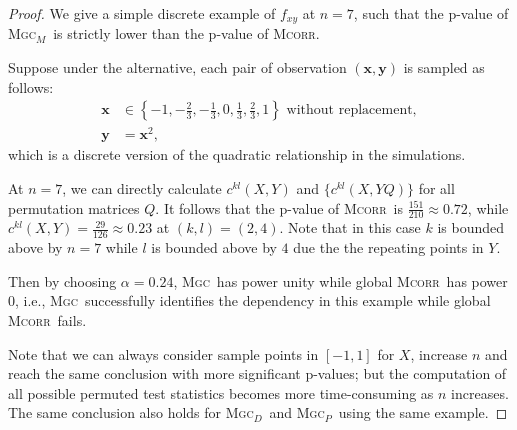 \documentclass[11pt]{article}
\providecommand{\sct}[1]{{\normalfont\textsc{#1}}}
\providecommand{\mb}[1]{\boldsymbol{#1}}
\newcommand{\G}{c}
\newcommand{\Mgc}{\sct{Mgc}}
\newcommand{\Mgcp}{\sct{Mgc$_P$}}
\newcommand{\Mgcd}{\sct{Mgc$_D$}}
\newcommand{\Mgcm}{\sct{Mgc$_M$}}
\newcommand{\Mcorr}{\sct{Mcorr}}
\begin{document}
\begin{proof}
We give a simple discrete example of $f_{xy}$ at $n=7$, such that the p-value of \Mgcm~is strictly lower than the p-value of \Mcorr.

Suppose under the alternative, each pair of observation $(\mb{x},\mb{y})$ is sampled as follows:
\begin{align*}
\mb{x} &\in \left\{-1,-\frac{2}{3},-\frac{1}{3},0,\frac{1}{3},\frac{2}{3},1\right\} \mbox{ without replacement}, \\
\mb{y} &= \mb{x}^2,
\end{align*}
which is a discrete version of the quadratic relationship in the simulations.

At $n=7$, we can directly calculate $\G^{kl}(X, Y)$ and $\{\G^{kl}(X, YQ)\}$ for all permutation matrices $Q$. It follows that the p-value of \Mcorr~is $\frac{151}{210} \approx 0.72$, while $\G^{kl}(X, Y)=\frac{29}{126} \approx 0.23$ at $(k,l)=(2,4)$. Note that in this case $k$ is bounded above by $n=7$ while $l$ is bounded above by $4$ due the the repeating points in $Y$. 

Then by choosing $\alpha=0.24$, \Mgc~has power unity while global \Mcorr~has power $0$, i.e., \Mgc~successfully identifies the dependency in this example while global \Mcorr~fails.

Note that we can always consider sample points in $[-1,1]$ for $X$, increase $n$ and reach the same conclusion with more significant p-values; but the computation of all possible permuted test statistics becomes more time-consuming as $n$ increases. The same conclusion also holds for \Mgcd~and \Mgcp~using the same example.
\end{proof}
\end{document}
